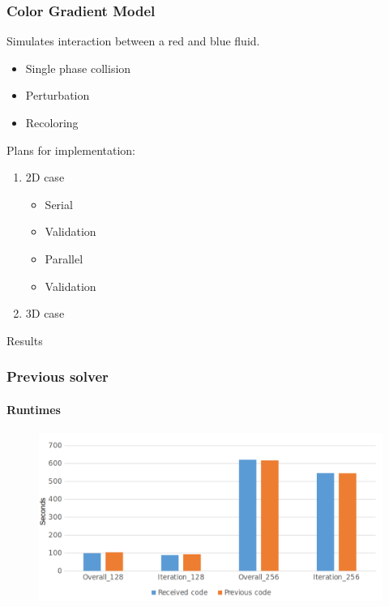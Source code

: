 \documentclass[xcolor=table]{beamer}
\begin{document}
	\begin{frame}
		\frametitle{Color Gradient Model}
		Simulates interaction between a red and blue fluid.
		\begin{itemize}
			\item Single phase collision
			\item Perturbation
			\item Recoloring
		\end{itemize}
		Plans for implementation:
		\begin{enumerate}
			\item 2D case
			\begin{itemize}
				\item Serial
				\item Validation
				\item Parallel
				\item Validation
			\end{itemize}
					\item 3D case
		\end{enumerate}
		
	\end{frame}
		\begin{frame}
		\begin{center}
			\Huge \textcolor{cranfieldblue}{Results}
		\end{center}
		\end{frame}
						\begin{frame}
							\frametitle{Previous solver}
							\framesubtitle{Runtimes}
							\begin{figure}
								\includegraphics[scale=0.25]{Resources/compareTimes.png}
							\end{figure}
						\end{frame}
\end{document}
